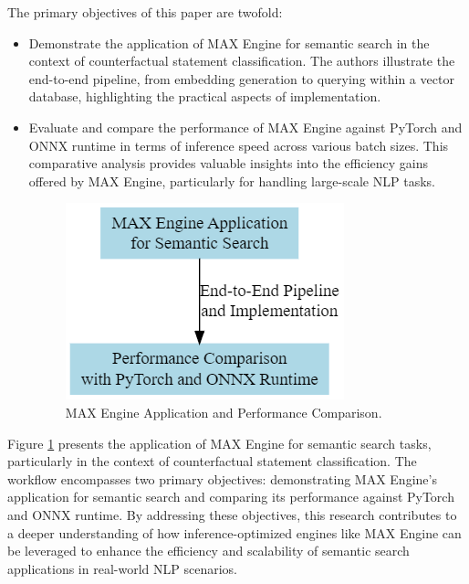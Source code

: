 \documentclass[conference]{IEEEtran}
\begin{document}
       The primary objectives of this paper are twofold:
\begin{itemize}
    
\item Demonstrate the application of MAX Engine for semantic search in the context of counterfactual statement classification. The authors illustrate the end-to-end pipeline, from embedding generation to querying within a vector database, highlighting the practical aspects of implementation.

\item Evaluate and compare the performance of MAX Engine against PyTorch and ONNX runtime in terms of inference speed across various batch sizes. This comparative analysis provides valuable insights into the efficiency gains offered by MAX Engine, particularly for handling large-scale NLP tasks.

\begin{figure}[H]
    \centerline{\includegraphics[width=\linewidth]{1.png}}
    \caption{MAX Engine Application and Performance Comparison.}
    \label{fig1}
\end{figure}

\end{itemize}

Figure \ref{fig1} presents the application of MAX Engine for semantic search tasks, particularly in the context of counterfactual statement classification. The workflow encompasses two primary objectives: demonstrating MAX Engine's application for semantic search and comparing its performance against PyTorch and ONNX runtime.
By addressing these objectives, this research contributes to a deeper understanding of how inference-optimized engines like MAX Engine can be leveraged to enhance the efficiency and scalability of semantic search applications in real-world NLP scenarios.
\end{document}
